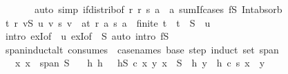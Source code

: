 \begin{isabellebody}
\ \ \ \ \ \ \ {\isacharparenleft}{\kern0pt}auto\ simp{\isacharcolon}{\kern0pt}\ if{\isacharunderscore}{\kern0pt}distrib{\isacharbrackleft}{\kern0pt}of\ {\isachardoublequoteopen}{\isasymlambda}r{\isachardot}{\kern0pt}\ r\ {\isacharasterisk}{\kern0pt}s\ a{\isachardoublequoteclose}\ \ a{\isacharbrackright}{\kern0pt}\ sum{\isachardot}{\kern0pt}If{\isacharunderscore}{\kern0pt}cases\ fS\ Int{\isacharunderscore}{\kern0pt}absorb{}{\isacharparenright}{\kern0pt}\isanewline
{}\isamarkupfalse%
\isanewline
\ \ \isamarkupfalse%
\ {\isachardoublequoteopen}{\isasymexists}t\ r{\isachardot}{\kern0pt}\ {\isacharparenleft}{\kern0pt}{\isasymSum}v{\isasymin}S{\isachardot}{\kern0pt}\ u\ v\ {\isacharasterisk}{\kern0pt}s\ v{\isacharparenright}{\kern0pt}\ {\isacharequal}{\kern0pt}\ {\isacharparenleft}{\kern0pt}{\isasymSum}a{\isasymin}t{\isachardot}{\kern0pt}\ r\ a\ {\isacharasterisk}{\kern0pt}s\ a{\isacharparenright}{\kern0pt}\ {\isasymand}\ finite\ t\ {\isasymand}\ t\ {\isasymsubseteq}\ S{\isachardoublequoteclose}\ \ u\isanewline
\ \ \ \ \isamarkupfalse%
\ {\isacharparenleft}{\kern0pt}intro\ exI{\isacharbrackleft}{\kern0pt}of\ {\isacharunderscore}{\kern0pt}\ u{\isacharbrackright}{\kern0pt}\ exI{\isacharbrackleft}{\kern0pt}of\ {\isacharunderscore}{\kern0pt}\ S{\isacharbrackright}{\kern0pt}{\isacharparenright}{\kern0pt}\ {\isacharparenleft}{\kern0pt}auto\ intro{\isacharcolon}{\kern0pt}\ fS{\isacharparenright}{\kern0pt}\isanewline
{}\isamarkupfalse%
%
\endisatagproof
{\isafoldproof}%
%
\isadelimproof
\isanewline
%
\endisadelimproof
\isanewline
{}\isamarkupfalse%
\ span{\isacharunderscore}{\kern0pt}induct{\isacharunderscore}{\kern0pt}alt\ {\isacharbrackleft}{\kern0pt}consumes\ {}{\isacharcomma}{\kern0pt}\ case{\isacharunderscore}{\kern0pt}names\ base\ step{\isacharcomma}{\kern0pt}\ induct\ set{\isacharcolon}{\kern0pt}\ span{\isacharbrackright}{\kern0pt}{\isacharcolon}{\kern0pt}\isanewline
\ \ \ x{\isacharcolon}{\kern0pt}\ {\isachardoublequoteopen}x\ {\isasymin}\ span\ S{\isachardoublequoteclose}\isanewline
\ \ \ h{}{\isacharcolon}{\kern0pt}\ {\isachardoublequoteopen}h\ {}{\isachardoublequoteclose}\ \ hS{\isacharcolon}{\kern0pt}\ {\isachardoublequoteopen}{\isasymAnd}c\ x\ y{\isachardot}{\kern0pt}\ x\ {\isasymin}\ S\ {\isasymLongrightarrow}\ h\ y\ {\isasymLongrightarrow}\ h\ {\isacharparenleft}{\kern0pt}c\ {\isacharasterisk}{\kern0pt}s\ x\ {\isacharplus}{\kern0pt}\ y{\isacharparenright}{\kern0pt}{\isachardoublequoteclose}\isanewline

\end{isabellebody}
